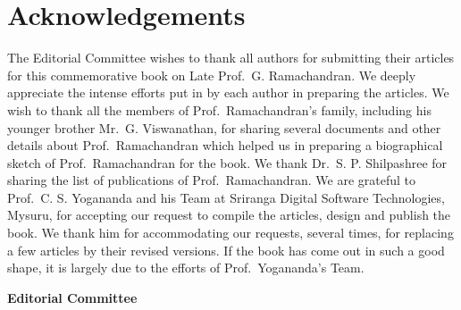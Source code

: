 \chapter*{Acknowledgements}

The Editorial Committee wishes to thank all authors for submitting their articles for this commemorative book on Late Prof.\ G. Ramachandran. We deeply appreciate the intense efforts put in by each author in preparing the articles. We wish to thank all the members of Prof.\ Ramachandran's family, including his younger brother Mr.\ G. Viswanathan, for sharing several documents and other details about Prof.\ Ramachandran which helped us in preparing a biographical sketch of Prof.\ Ramachandran for the book. We thank Dr.\ S. P. Shilpashree for sharing the list of publications of Prof.\ Ramachandran. We are grateful to Prof.\ C. S. Yogananda and his Team at Sriranga Digital Software Technologies, Mysuru, for accepting our request to compile the articles, design and publish the book. We thank him for accommodating our requests, several times, for replacing a few articles by their revised versions. If the book has come out in such a good shape, it is largely due to the efforts of Prof.\ Yogananda's Team.  
\bigskip

\hfill	{\bf Editorial Committee}
